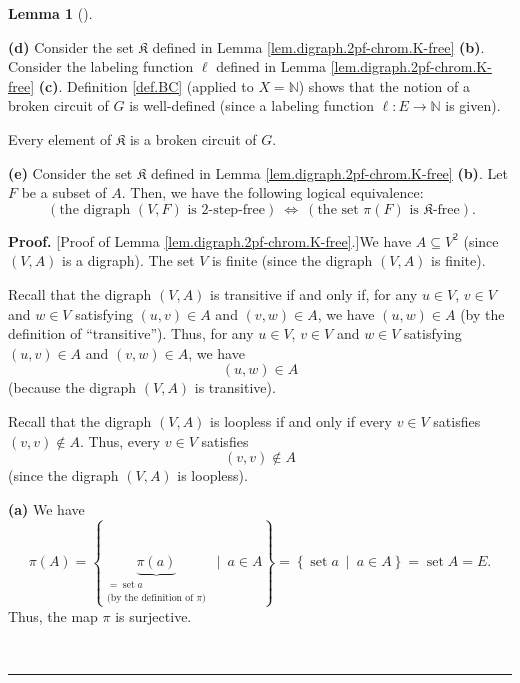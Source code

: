 \documentclass[numbers=enddot,12pt,final,onecolumn,notitlepage]{scrartcl}%
\theoremstyle{definition}
\newtheorem{lem}[theo]{Lemma}
\newenvironment{lemma}[1][]
{\begin{lem}[#1]\begin{leftbar}}
{\end{leftbar}\end{lem}}
\newenvironment{proof}[1][Proof]{\noindent\textbf{#1.} }{\ \rule{0.5em}{0.5em}}
\newenvironment{verlong}{}{}
\begin{document}
\begin{verlong}
\begin{lemma}
\textbf{(d)} Consider the set $\mathfrak{K}$ defined in Lemma
\ref{lem.digraph.2pf-chrom.K-free} \textbf{(b)}. Consider the labeling
function $\ell$ defined in Lemma \ref{lem.digraph.2pf-chrom.K-free}
\textbf{(c)}. Definition \ref{def.BC} (applied to $X=\mathbb{N}$) shows that
the notion of a broken circuit of $G$ is well-defined (since a labeling
function $\ell:E\rightarrow\mathbb{N}$ is given).

Every element of $\mathfrak{K}$ is a broken circuit of $G$.

\textbf{(e)} Consider the set $\mathfrak{K}$ defined in Lemma
\ref{lem.digraph.2pf-chrom.K-free} \textbf{(b)}. Let $F$ be a subset of $A$.
Then, we have the following logical equivalence:%
\[
\ \left(  \text{the digraph }\left(  V,F\right)  \text{ is }2\text{-step-free}%
\right)  \ \Longleftrightarrow\ \left(  \text{the set }\pi\left(  F\right)
\text{ is }\mathfrak{K}\text{-free}\right)  .
\]

\end{lemma}

\begin{proof}
[Proof of Lemma \ref{lem.digraph.2pf-chrom.K-free}.]We have $A\subseteq V^{2}$
(since $\left(  V,A\right)  $ is a digraph). The set $V$ is finite (since the
digraph $\left(  V,A\right)  $ is finite).

Recall that the digraph $\left(  V,A\right)  $ is transitive if and only if,
for any $u\in V$, $v\in V$ and $w\in V$ satisfying $\left(  u,v\right)  \in A$
and $\left(  v,w\right)  \in A$, we have $\left(  u,w\right)  \in A$ (by the
definition of \textquotedblleft transitive\textquotedblright). Thus, for any
$u\in V$, $v\in V$ and $w\in V$ satisfying $\left(  u,v\right)  \in A$ and
$\left(  v,w\right)  \in A$, we have
\begin{equation}
\left(  u,w\right)  \in A \label{pf.lem.digraph.2pf-chrom.K-free.transitive}%
\end{equation}
(because the digraph $\left(  V,A\right)  $ is transitive).

Recall that the digraph $\left(  V,A\right)  $ is loopless if and only if
every $v\in V$ satisfies $\left(  v,v\right)  \notin A$. Thus, every $v\in V$
satisfies%
\begin{equation}
\left(  v,v\right)  \notin A \label{pf.lem.digraph.2pf-chrom.K-free.loopless}%
\end{equation}
(since the digraph $\left(  V,A\right)  $ is loopless).

\textbf{(a)} We have
\[
\pi\left(  A\right)  =\left\{  \underbrace{\pi\left(  a\right)  }%
_{\substack{=\operatorname*{set}a\\\text{(by the definition of }\pi\text{)}%
}}\ \mid\ a\in A\right\}  =\left\{  \operatorname*{set}a\ \mid\ a\in
A\right\}  =\operatorname*{set}A=E.
\]
Thus, the map $\pi$ is surjective.


\end{proof}
\end{verlong}
\end{document}
